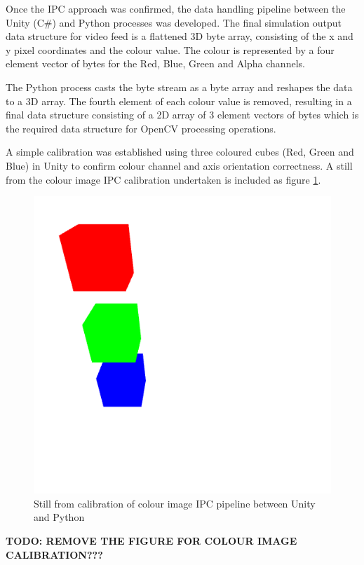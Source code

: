 \documentclass[]{aiaa-tc}%
\begin{document}
Once the IPC approach was confirmed, the data handling pipeline between the Unity (C\#) and Python processes was developed. The final simulation output data structure for video feed is a flattened 3D byte array, consisting of the x and y pixel coordinates and the colour value. The colour is represented by a four element vector of bytes for the Red, Blue, Green and Alpha channels. 

The Python process casts the byte stream as a byte array and reshapes the data to a 3D array. The fourth element of each colour value is removed, resulting in a final data structure consisting of a 2D array of 3 element vectors of bytes which is the required data structure for OpenCV processing operations. 

A simple calibration was established using three coloured cubes (Red, Green and Blue) in Unity to confirm colour channel and axis orientation correctness. A still from the colour image IPC calibration undertaken is included as figure \ref{f:unity_calibration}.


\begin{figure} %
	\centering
	\includegraphics[width=0.5\linewidth, height=0.5\linewidth]{unity_calibration.png}
	\caption{Still from calibration of colour image IPC pipeline between Unity and Python}
	\label{f:unity_calibration}
\end{figure}
\textbf{TODO: REMOVE THE FIGURE FOR COLOUR IMAGE CALIBRATION???}
\end{document}
